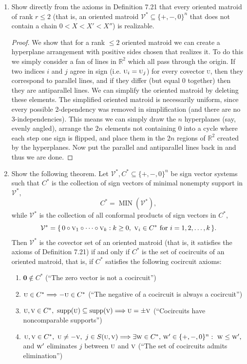 \documentclass{article}
\begin{document}
\begin{enumerate}
\item Show directly from the axioms in Definition 7.21 that every oriented matroid of rank $r\le 2$ (that is, an oriented matroid $\mathcal{V}^*\subseteq\{+,-,0\}^n$ that does not contain a chain $0<X<X'<X''$) is realizable.

\begin{proof}
    We show that for a rank $\leq 2$ oriented matroid we can create a hyperplane arrangement with positive sides chosen that realizes it. To do this we simply consider a fan of lines in $\mathbb{R}^2$ which all pass through the origin. If two indices $i$ and $j$ agree in sign (i.e. $\textsc{u}_i = \textsc{u}_j$) for every covector \textsc{u}, then they correspond to parallel lines, and if they differ (but equal $0$ together) then they are antiparallel lines. We can simplify the oriented matroid by deleting these elements. The simplified oriented matroid is necessarily uniform, since every possible 2-dependency was removed in simplification (and there are no 3-independencies). This means we can simply draw the $n$ hyperplanes (say, evenly angled), arrange the $2n$ elements not containing $0$ into a cycle where each step one sign is flipped, and place them in the $2n$ regions of $\mathbb{R}^2$ created by the hyperplanes. Now put the parallel and antiparallel lines back in and thus we are done.
\end{proof}

\item Show the following theorem. Let $\mathcal{V}^*,C^*\subseteq\{+,-,0\}^n$ be sign vector systems such that $C^*$ is the collection of sign vectors of minimal nonempty support in $\mathcal{V}^*$, \[
C^*=\operatorname{MIN}(\mathcal{V}^*),
\]
while $\mathcal{V}^*$ is the collection of all conformal products of sign vectors in $C^*$, \[
\mathcal{V}^*=\{\,0\circ \textsc{v}_1\circ\cdots\circ \textsc{v}_k : k\ge 0,\ \textsc{v}_i\in C^* \text{ for } i=1,2,\ldots,k\,\}.
\]
Then $\mathcal{V}^*$ is the covector set of an oriented matroid (that is, it satisfies the axioms of Definition 7.21) if and only if $C^*$ is the set of cocircuits of an oriented matroid, that is, if $C^*$ satisfies the following cocircuit axioms:

\begin{enumerate}
\item[(C0)] $\textbf{0}\notin C^*$ (``The zero vector is not a cocircuit'')
\item[(C1)] $\textsc{u}\in C^* \Longrightarrow -\textsc{u}\in C^*$ (``The negative of a cocircuit is always a cocircuit'')
\item[(C2)] $\textsc{u},\textsc{v}\in C^*,\ \operatorname{supp}(\textsc{u})\subseteq \operatorname{supp}(\textsc{v})\Longrightarrow \textsc{u}=\pm \textsc{v}$ (``Cocircuits have noncomparable supports'')
\item[(C3)] $\textsc{u},\textsc{v}\in C^*,\ \textsc{u}\ne -\textsc{v},\ j\in S(\textsc{u},\textsc{v})\Longrightarrow \exists \textsc{w}\in C^*,\, \textsc{w}'\in\{+,-,0\}^n:\ \textsc{w}\le \textsc{w}',\ $ and $\textsc{w}'$ eliminates $j$ between $\textsc{u}$ and $\textsc{v}$ (``The set of cocircuits admits elimination'')
\end{enumerate}


\end{enumerate}
\end{document}

